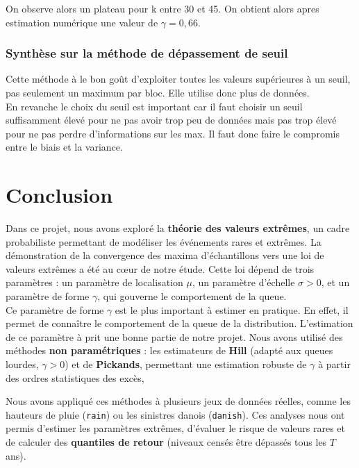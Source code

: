\documentclass{article}
\theoremstyle{plain}
\theoremstyle{definition}
\theoremstyle{plain}
\begin{document}
\noindent On observe alors un plateau pour k entre 30 et 45. On obtient alors apres estimation numérique une valeur de $\gamma = 0,66$.

\subsubsection{Synthèse sur la méthode de dépassement de seuil}
\noindent Cette méthode à le bon goût d'exploiter toutes les valeurs supérieures à un seuil, pas seulement un maximum par bloc. Elle utilise donc plus de données.
\\
En revanche le choix du seuil est important car il faut choisir un seuil suffisamment élevé pour ne pas avoir trop peu de données mais pas trop élevé pour ne pas perdre d'informations sur les max. Il faut donc faire le compromis entre le biais et la variance.

\section{Conclusion}

Dans ce projet, nous avons exploré la \textbf{théorie des valeurs extrêmes}, un cadre probabiliste permettant de modéliser les événements rares et extrêmes. 
La démonstration de la convergence des maxima d’échantillons vers une loi de valeurs extrêmes a été au cœur de notre étude. Cette loi dépend de trois paramètres : un paramètre de localisation $\mu$, un paramètre d’échelle $\sigma > 0$, et un paramètre de forme $\gamma$, qui gouverne le comportement de la queue.
\\
Ce paramètre de forme $\gamma$ est le plus important à estimer en pratique. En effet, il permet de connaître le comportement de la queue de la distribution.
L'estimation de ce paramètre à prit une bonne partie de notre projet. Nous avons utilisé
des méthodes \textbf{non paramétriques} : les estimateurs de \textbf{Hill} (adapté aux queues lourdes, $\gamma > 0$) et de \textbf{Pickands}, permettant une estimation robuste de $\gamma$ à partir des ordres statistiques des excès,



\medskip

Nous avons appliqué ces méthodes à plusieurs jeux de données réelles, comme les hauteurs de pluie (\texttt{rain}) ou les sinistres danois (\texttt{danish}). Ces analyses nous ont permis d'estimer les paramètres extrêmes, d'évaluer le risque de valeurs rares et de calculer des \textbf{quantiles de retour} (niveaux censés être dépassés tous les $T$ ans).
\end{document}
